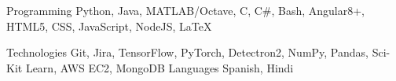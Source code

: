 
\begin{cvskills}
  \cvskill
    {Programming} %
    {Python, Java, MATLAB/Octave, C, C\#, Bash, Angular8+, HTML5, CSS, JavaScript, NodeJS, LaTeX} %

  \cvskill
    {Technologies} %
    {Git, Jira, TensorFlow, PyTorch, Detectron2, NumPy, Pandas, Sci-Kit Learn, AWS EC2, MongoDB} %
  \cvskill
    {Languages}
    {Spanish, Hindi}
\end{cvskills}
